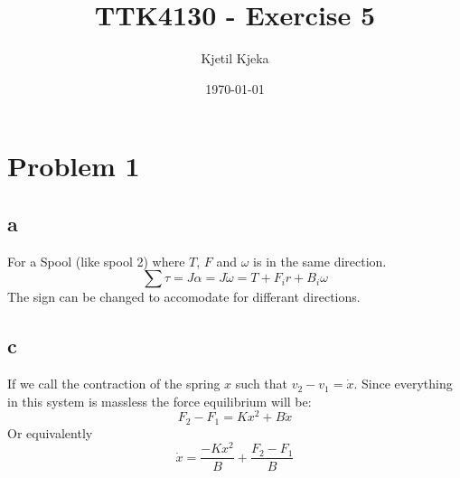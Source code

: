 \documentclass[11pt]{article}
\author{Kjetil Kjeka}
\title{TTK4130 - Exercise 5}
\date{\today}
\begin{document}
\maketitle
\section*{Problem 1}
\subsection*{a}
For a Spool (like spool 2) where $T$, $F$ and $\omega$ is in the same direction.
\[\sum \tau = J \alpha = J \dot{\omega} = T + F_i r + B_i \omega \]
The sign can be changed to accomodate for differant directions.

\subsection*{c}
If we call the contraction of the spring $x$ such that $v_2 - v_1 = \dot{x}$. Since everything in this system is massless the force equilibrium will be:
\[ F_2 - F_1 = K x^2 + B \dot{x} \]
Or equivalently
\[ \dot{x} = \frac{-K x^2}{B} + \frac{F_2 - F_1}{B} \]
\end{document}
